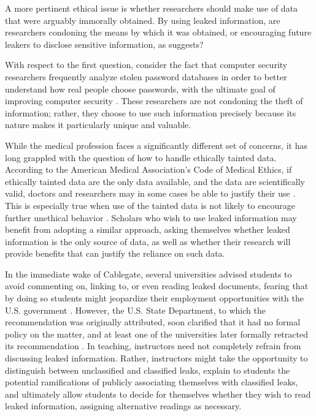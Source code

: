 \documentclass[12pt]{article}
\begin{document}
A more pertinent ethical issue is whether researchers should make use of data that were arguably 
immorally obtained. By using leaked information, are researchers condoning the means by which it was 
obtained, or encouraging future leakers to disclose sensitive information, as \citet{conway2013why} suggests?

With respect to the first question, consider the fact that computer security researchers frequently 
analyze stolen password databases in order to 
better understand how real people choose passwords, with the ultimate goal of improving computer 
security \citep{imperva2010imperva,bbc2013`123456}.
These researchers are not condoning the theft of information; rather, 
they choose to use such information precisely because its nature makes it particularly unique and 
valuable. 

While the medical profession faces a significantly different set of concerns, it has long 
grappled with the question of how to handle ethically tainted data. According to the American Medical Association's 
Code of Medical Ethics, if ethically tainted data are the only data available, and the data are scientifically 
valid, doctors and researchers may in some cases be able to justify their 
use \citep{american_medical_association1998opinion}. This is especially true when use of the tainted data is not likely to 
encourage further unethical behavior \citep{zion1998moral}. Scholars who wish to use leaked information may benefit from adopting a similar approach, asking themselves whether leaked information is the only source of data, as well as whether their research will provide benefits that can justify the reliance on such data. 

In the immediate wake of Cablegate, several universities advised students to avoid commenting on, linking to, 
or even reading leaked documents, 
fearing that by doing so students might jeopardize their employment opportunities with the U.S. 
government \citep{grinberg2010will}. However, the U.S. State Department, to which the recommendation 
was originally attributed, soon clarified that it had no formal policy on the matter, and at least one of the 
universities later formally retracted its recommendation \citep{gustin2010columbia}.
In teaching, instructors need not completely refrain from discussing leaked information. Rather, instructors 
might take the opportunity to distinguish between unclassified and classified leaks, explain to 
students the potential ramifications of publicly associating themselves with classified leaks, and 
ultimately allow students to decide for themselves whether they wish to read leaked information, assigning alternative 
readings as necessary.
\end{document}
